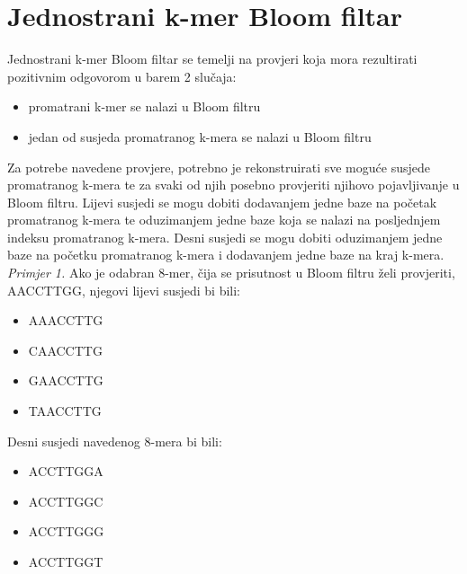 \documentclass[times, utf8, seminar, numeric]{fer}
\begin{document}
\section{Jednostrani k-mer Bloom filtar}
Jednostrani k-mer Bloom filtar se temelji na provjeri koja mora rezultirati
pozitivnim odgovorom u barem 2 slučaja:
\begin{itemize}
  \item{promatrani k-mer se nalazi u Bloom filtru}
  \item{jedan od susjeda promatranog k-mera se nalazi u Bloom filtru}
\end{itemize}
Za potrebe navedene provjere, potrebno je rekonstruirati sve moguće susjede
promatranog k-mera te za svaki od njih posebno provjeriti njihovo pojavljivanje
u Bloom filtru. Lijevi susjedi se mogu dobiti dodavanjem jedne baze na početak
promatranog k-mera te oduzimanjem jedne baze koja se nalazi na posljednjem indeksu
promatranog k-mera. Desni susjedi se mogu dobiti oduzimanjem jedne baze na početku
promatranog k-mera i dodavanjem jedne baze na kraj k-mera.\\
\textit{Primjer 1.} Ako je odabran 8-mer, čija se prisutnost u Bloom filtru želi
provjeriti, AACCTTGG, njegovi lijevi susjedi bi bili:
\begin{itemize}
  \item{AAACCTTG}
  \item{CAACCTTG}
  \item{GAACCTTG}
  \item{TAACCTTG}
\end{itemize}
Desni susjedi navedenog 8-mera bi bili:
\begin{itemize}
  \item{ACCTTGGA}
  \item{ACCTTGGC}
  \item{ACCTTGGG}
  \item{ACCTTGGT}
\end{itemize}

\end{document}
